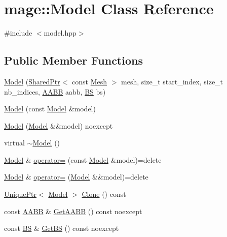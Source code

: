 \hypertarget{classmage_1_1_model}{}\section{mage\+:\+:Model Class Reference}
\label{classmage_1_1_model}


{\ttfamily \#include $<$model.\+hpp$>$}

\subsection*{Public Member Functions}
\begin{DoxyCompactItemize}
\item 
\hyperlink{classmage_1_1_model_a6f8f226a76be925e0fa2e9ed045fded2}{Model} (\hyperlink{namespacemage_a1e01ae66713838a7a67d30e44c67703e}{Shared\+Ptr}$<$ const \hyperlink{classmage_1_1_mesh}{Mesh} $>$ mesh, size\+\_\+t start\+\_\+index, size\+\_\+t nb\+\_\+indices, \hyperlink{structmage_1_1_a_a_b_b}{A\+A\+BB} aabb, \hyperlink{structmage_1_1_b_s}{BS} bs)
\item 
\hyperlink{classmage_1_1_model_ac5f1d340bbfefd30bec3e6343a86059a}{Model} (const \hyperlink{classmage_1_1_model}{Model} \&model)
\item 
\hyperlink{classmage_1_1_model_aa3e0b4a875c8337c4ced47e390be09ef}{Model} (\hyperlink{classmage_1_1_model}{Model} \&\&model) noexcept
\item 
virtual \hyperlink{classmage_1_1_model_af9f45ed2dcf470f85bbfd144ca9857a7}{$\sim$\+Model} ()
\item 
\hyperlink{classmage_1_1_model}{Model} \& \hyperlink{classmage_1_1_model_a563515c64ec39cfcda9f6ca37576391b}{operator=} (const \hyperlink{classmage_1_1_model}{Model} \&model)=delete
\item 
\hyperlink{classmage_1_1_model}{Model} \& \hyperlink{classmage_1_1_model_a084e30d15822bfefa79128f30a57cc02}{operator=} (\hyperlink{classmage_1_1_model}{Model} \&\&model)=delete
\item 
\hyperlink{namespacemage_a3316d7143a973e37adf1110f2e80ca31}{Unique\+Ptr}$<$ \hyperlink{classmage_1_1_model}{Model} $>$ \hyperlink{classmage_1_1_model_a39d5f0b2b83729a68569072d69113ed7}{Clone} () const
\item 
const \hyperlink{structmage_1_1_a_a_b_b}{A\+A\+BB} \& \hyperlink{classmage_1_1_model_a07af22d1e72ffde3ad33b709a8d5c7f4}{Get\+A\+A\+BB} () const noexcept
\item 
const \hyperlink{structmage_1_1_b_s}{BS} \& \hyperlink{classmage_1_1_model_a7d99f18fd9cd6902795f77995b87bea2}{Get\+BS} () const noexcept

\end{DoxyCompactItemize}
